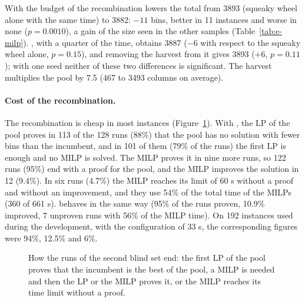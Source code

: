 With the budget of \cfgbal{} the recombination lowers the total from 3893 (squeaky wheel alone with the same time) to 3882: $-11$ bins, better in 11 instances and worse in none ($p=0.0010$), a gain
of the size seen in the other samples (Table~\ref{tab:e-milp}). \cfgfast{}, with a quarter of the time, obtains 3887 ($-6$ with respect to the squeaky wheel alone, $p=0.15$), and removing the harvest from it gives 3893 ($+6$, $p=0.11$);
with one seed neither of these two differences is significant. The harvest multiplies the pool by 7.5 (467 to 3493 columns on average).

\paragraph{Cost of the recombination.}
The recombination is cheap in most instances (Figure~\ref{fig:e-outcome}). With \cfgbal{}, the LP of the pool proves in 113 of the 128 runs (88\%) that the pool has no solution with fewer bins than the incumbent, and in 101 of them (79\% of the runs) the first
LP is enough and no MILP is solved. The MILP proves it in nine more runs, so 122 runs (95\%) end with a proof for the pool, and the MILP improves the solution in 12 (9.4\%). In six runs (4.7\%) the MILP reaches its limit of 60 s without a proof
and without an improvement, and they use 54\% of the total time of the MILPs (360 of 661 s). \cfgfast{} behaves in the same way (95\% of the runs proven, 10.9\% improved, 7 unproven runs with 56\% of the MILP time). On 192 instances used during the development,
with the configuration of 33 s, the corresponding figures were 94\%, 12.5\% and 6\%.

\begin{figure}[t]
\centering
{}
\caption{How the runs of the second blind set end: the first LP of the pool proves that the incumbent is the best of the pool, a MILP is needed and then the LP or the MILP proves it, or the MILP reaches
its time limit without a proof.}
\label{fig:e-outcome}
\end{figure}

